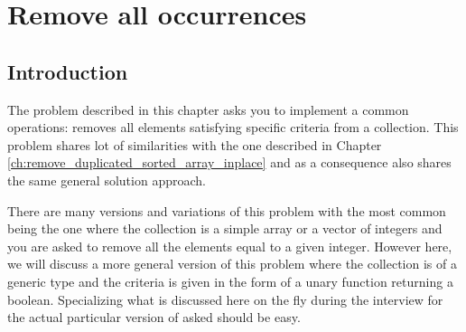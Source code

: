 %



\chapter{Remove all occurrences}
\label{ch:remove_all_occurrences_unsorted_array_inplace}
\section*{Introduction}
The problem described in this chapter asks you to implement a common operations: 
removes all elements satisfying specific criteria from a collection.
This problem shares lot of similarities with the one described in Chapter \ref{ch:remove_duplicated_sorted_array_inplace}
and as a consequence also shares the same general solution approach. 

There are many versions and variations of this problem with the most common being 
the one where the collection is a simple array or a vector of integers
and you are asked to remove all the elements equal to a given integer.
However here, we will discuss a more general version of this problem where the collection
is of a generic type 
and the criteria is given in the form of a unary function returning a boolean. 
Specializing what is discussed here on the fly 
during the interview for the actual particular version of asked should be easy.


